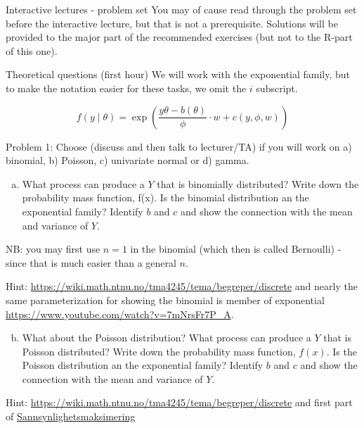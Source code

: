 \documentclass[
  ignorenonframetext,
]{beamer}
\providecommand{\tightlist}{%
  \setlength{\itemsep}{0pt}\setlength{\parskip}{0pt}}
\begin{document}
\begin{frame}{Interactive lectures - problem set}
\label{interactive-lectures---problem-set}
You may of cause read through the problem set before the interactive
lecture, but that is not a prerequisite. Solutions will be provided to
the major part of the recommended exercises (but not to the R-part of
this one).

\begin{block}{Theoretical questions (first hour)}
\label{theoretical-questions-first-hour}
We will work with the exponential family, but to make the notation
easier for these tasks, we omit the \(i\) subscript.

\[ f(y \mid \theta)=\exp \left( \frac{y \theta-b(\theta)}{\phi}\cdot w + c(y, \phi, w) \right) \]

\begin{block}{Problem 1:}
\label{problem-1}
Choose (discuss and then talk to lecturer/TA) if you will work on a)
binomial, b) Poisson, c) univariate normal or d) gamma.
\end{block}
\end{block}
\end{frame}

\begin{frame}
\begin{enumerate}
[a)]
\tightlist
\item
  What process can produce a \(Y\) that is binomially distributed? Write
  down the probability mass function, f(x). Is the binomial distribution
  an the exponential family? Identify \(b\) and \(c\) and show the
  connection with the mean and variance of \(Y\).
\end{enumerate}

NB: you may first use \(n=1\) in the binomial (which then is called
Bernoulli) - since that is much easier than a general \(n\).

Hint: \url{https://wiki.math.ntnu.no/tma4245/tema/begreper/discrete} and
nearly the same parameterization for showing the binomial is member of
exponential \url{https://www.youtube.com/watch?v=7mNrsFr7P_A}.

\begin{enumerate}
[a)]
\setcounter{enumi}{1}
\tightlist
\item
  What about the Poisson distribution? What process can produce a \(Y\)
  that is Poisson distributed? Write down the probability mass function,
  \(f(x)\). Is the Poisson distribution an the exponential family?
  Identify \(b\) and \(c\) and show the connection with the mean and
  variance of \(Y\).
\end{enumerate}

Hint: \url{https://wiki.math.ntnu.no/tma4245/tema/begreper/discrete} and
first part of
\href{https://mediasite.ntnu.no/Mediasite/Play/db9c6fbc45bf48abb8a4dd00ff146e081d?catalog=0fce6173-7a98-4db7-84b7-50cba3a3a341}{Sannsynlighetsmaksimering}
\end{frame}
\end{document}
